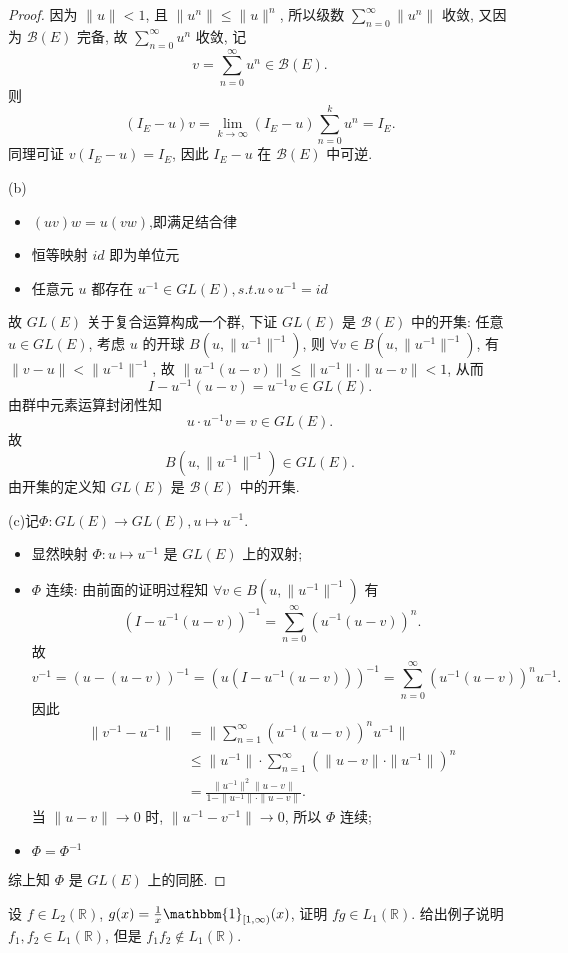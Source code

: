\begin{proof}
因为 $\|u\|<1$, 且 $\|u^n\|\leq\|u\|^n$, 所以级数 $\sum_{n=0}^{\infty}\|u^n\|$ 收敛, 
又因为 $\mathcal{B}(E)$ 完备, 故 $\sum_{n=0}^{\infty}u^n$ 收敛, 记
\[v=\sum_{n=0}^{\infty}u^n\in\mathcal{B}(E).\]
则
\[(I_E-u)v=\lim_{k\to\infty}(I_E-u)\sum_{n=0}^ku^n=I_E.\]
同理可证 $v(I_E-u)=I_E$, 因此 $I_E-u$ 在 $\mathcal{B}(E)$ 中可逆.

(b)\begin{itemize}
\item $(uv)w=u(vw)$,即满足结合律
\item 恒等映射 $id$ 即为单位元
\item 任意元 $u$ 都存在 $u^{-1}\in GL(E),s.t.u\circ u^{-1}=id$
\end{itemize}
故 $GL(E)$ 关于复合运算构成一个群, 
下证 $GL(E)$ 是 $\mathcal{B}(E)$ 中的开集: 
任意 $u\in GL(E)$, 考虑 $u$ 的开球 $B(u,\|u^{-1}\|^{-1})$, 
则 $\forall v\in B(u,\|u^{-1}\|^{-1})$, 有 $\|v-u\|<\|u^{-1}\|^{-1}$, 
故 $\|u^{-1}(u-v)\|\leq \|u^{-1}\|\cdot\|u-v\|<1$, 从而
\[I-u^{-1}(u-v)=u^{-1}v\in GL(E).\]
由群中元素运算封闭性知
\[u\cdot u^{-1}v=v\in GL(E).\]
故
\[B(u,\|u^{-1}\|^{-1})\in GL(E).\]
由开集的定义知 $GL(E)$ 是 $\mathcal{B}(E)$ 中的开集.

(c)记$\Phi:GL(E)\to GL(E),u\mapsto u^{-1}$.
\begin{itemize}
\item 显然映射 $\Phi:u\mapsto u^{-1}$ 是 $GL(E)$ 上的双射;
\item $\Phi$ 连续: 由前面的证明过程知 $\forall v\in B(u,\|u^{-1}\|^{-1})$ 有
\[(I-u^{-1}(u-v))^{-1}=\sum_{n=0}^{\infty}(u^{-1}(u-v))^n.\]
故
\[v^{-1}=(u-(u-v))^{-1}=(u(I-u^{-1}(u-v)))^{-1}=\sum_{n=0}^{\infty}(u^{-1}(u-v))^nu^{-1}.\]
因此
\[\begin{split}
\|v^{-1}-u^{-1}\|
&=\|\sum_{n=1}^{\infty}(u^{-1}(u-v))^nu^{-1}\|\\
&\leq\|u^{-1}\|\cdot\sum_{n=1}^{\infty}(\|u-v\|\cdot\|u^{-1}\|)^n\\
&=\frac{\|u^{-1}\|^2\|u-v\|}{1-\|u^{-1}\|\cdot\|u-v\|}.
\end{split}\]
当 $\|u-v\|\to 0$ 时, $\|u^{-1}-v^{-1}\|\to 0$, 所以 $\Phi$ 连续;
\item $\Phi=\Phi^{-1}$
\end{itemize}
综上知 $\Phi$ 是 $GL(E)$ 上的同胚.
\end{proof}



\begin{exercise}
    设 $f\in L_2(\mathbb{R})$, $g(x)=\frac{1}{x}\mathbbm{1}_{[1,\infty)}(x)$, 
    证明 $fg\in L_1(\mathbb{R})$. 给出例子说明 $f_1,f_2\in L_1(\mathbb{R})$, 但是 $f_1f_2\notin L_1(\mathbb{R})$.
\end{exercise}

